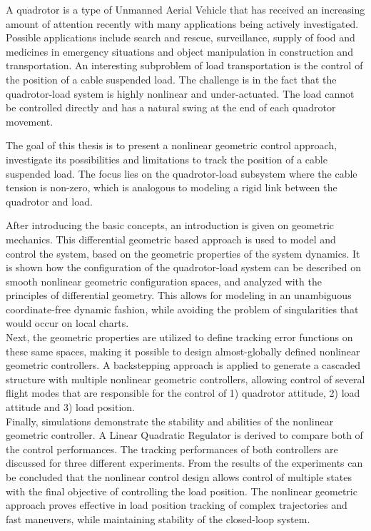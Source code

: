 \vspace{-2cm}
A quadrotor is a type of Unmanned Aerial Vehicle that has received an increasing amount of attention recently with many applications being actively investigated. 
Possible applications include search and rescue, surveillance, supply of food and medicines in emergency situations and object manipulation in construction and transportation.
An interesting subproblem of load transportation is the control of the position of a cable suspended load. The challenge is in the fact that the quadrotor-load system is highly nonlinear and under-actuated. The load cannot be controlled directly and has a natural swing at the end of each quadrotor movement. 

The goal of this thesis is to present a nonlinear geometric control approach, investigate its possibilities and limitations to track the position of a cable suspended load. The focus lies on the quadrotor-load subsystem where the cable tension is non-zero, which is analogous to modeling a rigid link between the quadrotor and load.

After introducing the basic concepts, an introduction is given on geometric mechanics. This differential geometric based approach is used to model and control the system, based on the geometric properties of the system dynamics. 
It is shown how the configuration of the quadrotor-load system can be described on smooth nonlinear geometric configuration spaces, and analyzed with the principles of differential geometry. 
This allows for modeling in an unambiguous coordinate-free dynamic fashion, while avoiding the problem of singularities that would occur on local charts. \\
Next, the geometric properties are utilized to define tracking error functions on these same spaces, making it possible to design almost-globally defined nonlinear geometric controllers. A backstepping approach is applied to generate a cascaded structure with multiple nonlinear geometric controllers, allowing control of several flight modes that are responsible for the control of 1) quadrotor attitude, 2) load attitude and 3) load position.\\ 
Finally, simulations demonstrate the stability and abilities of the nonlinear geometric controller. A Linear Quadratic Regulator is derived to compare both of the control performances. The tracking performances of both controllers are discussed for three different experiments. 
From the results of the experiments can be concluded that the nonlinear control design allows control of multiple states with the final objective of controlling the load position. The nonlinear geometric approach proves effective in load position tracking of complex trajectories and fast maneuvers,
while maintaining stability of the closed-loop system. 
 


